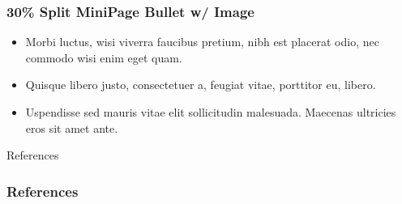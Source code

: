 \documentclass[xcolor=dvipsnames]{beamer} %
\begin{document}
\begin{frame}
\frametitle{30\% Split MiniPage Bullet w/ Image}
\begin{minipage}[]{.3\textwidth}
    \tiny
    \begin{itemize}
    \item Morbi luctus, wisi viverra faucibus pretium, nibh est
            placerat odio, nec commodo wisi enim eget quam. 
    \item Quisque libero justo, consectetuer a, feugiat vitae,
            porttitor eu, libero. 
    \item Uspendisse sed mauris vitae
            elit sollicitudin malesuada. Maecenas ultricies eros
            sit amet ante.
    \end{itemize}
\end{minipage}%
\begin{minipage}[]{.7\textwidth}
    \begin{center}
    \end{center}
\end{minipage}
\end{frame}

 \begin{frame}{References}
    \frametitle{References}
     \printbibliography
 \end{frame} 
\end{document}
